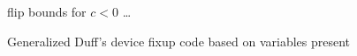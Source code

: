 \begin{figure}[H]
    \begin{algorithmic}
             \Comment flip bounds for $c < 0$
                \State {}
            \EndCase
            \State \ldots
                \State {}
            \EndCase
        \EndSwitch
    \end{algorithmic}
    \caption{Generalized Duff's device fixup code based on variables present}
    \label{fig:impl:fixup:duff:fixup-bound}
\end{figure}